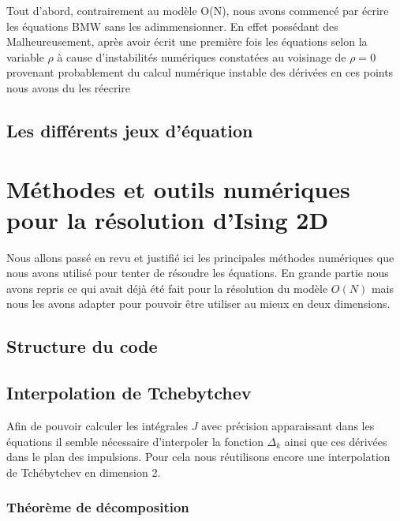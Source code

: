 \documentclass[10pt]{article}
\begin{document}
\begin{multicols}{2}
Tout d'abord, contrairement au modèle O(N), nous avons commencé par écrire les équations BMW sans les adimmensionner. En effet possédant des  \\

Malheureusement, après avoir écrit une première fois les équations selon la variable $\rho$ à cause d'instabilités numériques constatées au voisinage de $\rho = 0$ provenant probablement du calcul numérique instable des dérivées en ces points nous avons du les réecrire  

\subsection{Les différents jeux d'équation}

\pagebreak

\section{Méthodes et outils numériques pour la résolution d'Ising 2D}

Nous allons passé en revu et justifié ici les principales méthodes numériques que nous avons utilisé pour tenter de résoudre les équations. En grande partie nous avons repris ce qui avait déjà été fait pour la résolution du modèle $O(N)$ mais nous les avons adapter pour pouvoir être utiliser au mieux en deux dimensions.


\subsection{Structure du code}




\subsection{Interpolation de Tchebytchev}

Afin de pouvoir calculer les intégrales $J$ avec précision apparaissant dans les équations il semble nécessaire d'interpoler la fonction $\Delta_k$ ainsi que ces dérivées dans le plan des impulsions. Pour cela nous réutilisons encore une interpolation de Tchébytchev en dimension 2. 

\subsubsection{Théorème de décomposition}


\end{multicols}
\end{document}
